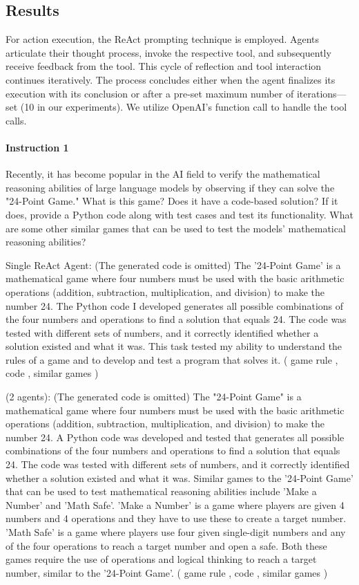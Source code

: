 \subsection{Results}
For action execution, the ReAct prompting technique is employed. Agents articulate their thought process, invoke the respective tool, and subsequently receive feedback from the tool. This cycle of reflection and tool interaction continues iteratively. The process concludes either when the agent finalizes its execution with its conclusion or after a pre-set maximum number of iterations—set (10 in our experiments). We utilize OpenAI's function call to handle the tool calls.

\paragraph{Instruction 1} Recently, it has become popular in the AI field to verify the mathematical reasoning abilities of large language models by observing if they can solve the "24-Point Game." What is this game? Does it have a code-based solution? If it does, provide a Python code along with test cases and test its functionality. What are some other similar games that can be used to test the models' mathematical reasoning abilities?

{\color{blue} Single ReAct Agent}: (The generated code is omitted) The '24-Point Game' is a mathematical game where four numbers must be used with the basic arithmetic operations (addition, subtraction, multiplication, and division) to make the number 24. The Python code I developed generates all possible combinations of the four numbers and operations to find a solution that equals 24. The code was tested with different sets of numbers, and it correctly identified whether a solution existed and what it was. This task tested my ability to understand the rules of a game and to develop and test a program that solves it. ({\color{teal} game rule \cmark}, {\color{teal} code \cmark}, {\color{red} similar games \xmark})

{\color{magenta} \framework (2 agents)}: (The generated code is omitted) The "24-Point Game" is a mathematical game where four numbers must be used with the basic arithmetic operations (addition, subtraction, multiplication, and division) to make the number 24. A Python code was developed and tested that generates all possible combinations of the four numbers and operations to find a solution that equals 24. The code was tested with different sets of numbers, and it correctly identified whether a solution existed and what it was. Similar games to the '24-Point Game' that can be used to test mathematical reasoning abilities include 'Make a Number' and 'Math Safe'. 'Make a Number' is a game where players are given 4 numbers and 4 operations and they have to use these to create a target number. 'Math Safe' is a game where players use four given single-digit numbers and any of the four operations to reach a target number and open a safe. Both these games require the use of operations and logical thinking to reach a target number, similar to the '24-Point Game'. ({\color{teal} game rule \cmark}, {\color{teal} code \cmark}, {\color{teal} similar games \cmark})
    
